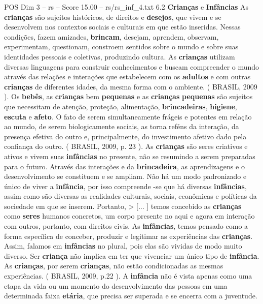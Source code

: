 \begin{textsample}{POS Dim 3 – rs – Score 15.00 – rs/rs\_inf\_4.txt}  \label{ex:f3_pos_249}
6.2 \textbf{Crianças} e \textbf{Infâncias} As \textbf{crianças} são sujeitos históricos, de direitos e \textbf{desejos}, que vivem e se desenvolvem nos contextos sociais e culturais em que estão inseridas.
Nessas condições, fazem amizades, \textbf{brincam}, desejam, aprendem, observam, experimentam, questionam, constroem sentidos sobre o mundo e sobre suas identidades pessoais e coletivas, produzindo cultura.
As \textbf{crianças} utilizam diversas linguagens para construir conhecimentos e buscam compreender o mundo através das relações e interações que estabelecem com os \textbf{adultos} e com outras \textbf{crianças} de diferentes idades, da mesma forma com o ambiente. ( BRASIL, 2009 ).
Os \textbf{bebês}, as \textbf{crianças} bem \textbf{pequenas} e as \textbf{crianças} \textbf{pequenas} são sujeitos que necessitam de atenção, proteção, alimentação, \textbf{brincadeiras}, \textbf{higiene}, \textbf{escuta} e \textbf{afeto}.
O fato de serem simultaneamente frágeis e potentes em relação ao mundo, de serem biologicamente sociais, as torna reféns da interação, da presença efetiva do outro e, principalmente, do investimento afetivo dado pela confiança do outro. ( BRASIL, 2009, p. 23 ).
As \textbf{crianças} são seres criativos e ativos e vivem suas \textbf{infâncias} no presente, não se resumindo a serem preparadas para o futuro.
Através das interações e da \textbf{brincadeira}, as aprendizagens e o desenvolvimento se constituem e se ampliam.
Não há um modo padronizado e único de viver a \textbf{infância}, por isso compreende -se que há diversas \textbf{infâncias}, assim como são diversas as realidades culturais, sociais, econômicas e políticas da sociedade em que se inserem.
Portanto, > [... ] temos concebido as \textbf{crianças} como \textbf{seres} humanos concretos, um corpo presente no aqui e agora em interação com outros, portanto, com direitos civis.
As \textbf{infâncias}, temos pensado como a forma específica de conceber, produzir e legitimar as experiências das \textbf{crianças}.
Assim, falamos em \textbf{infâncias} no plural, pois elas são vividas de modo muito diverso.
Ser \textbf{criança} não implica em ter que vivenciar um único tipo de \textbf{infância}.
As \textbf{crianças}, por serem \textbf{crianças}, não estão condicionadas as mesmas experiências. ( BRASIL, 2009, p.22 ).
A \textbf{infância} não é vista apenas como uma etapa da vida ou um momento do desenvolvimento das pessoas em uma determinada faixa \textbf{etária}, que precisa ser superada e se encerra com a juventude.

\end{textsample}

